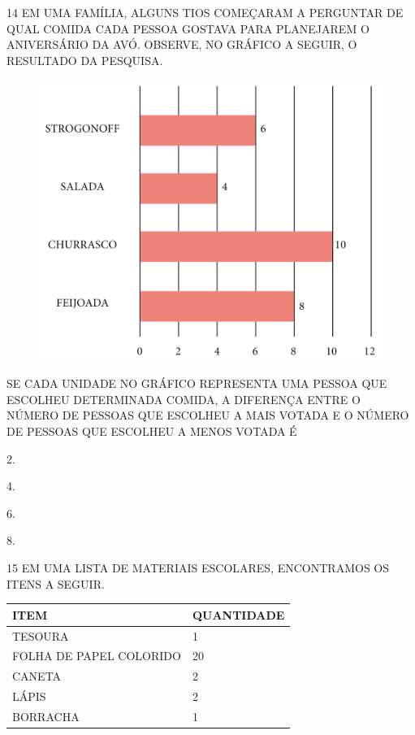 \num{14} EM UMA FAMÍLIA, ALGUNS TIOS COMEÇARAM A PERGUNTAR DE QUAL COMIDA CADA
PESSOA GOSTAVA PARA PLANEJAREM O ANIVERSÁRIO DA AVÓ. OBSERVE, NO GRÁFICO A SEGUIR,
O RESULTADO DA PESQUISA.

\begin{figure}[H]
\centering
\includegraphics[width=\textwidth]{./media/SAEB_1ANO_MAT_FIGURA141.png}
\end{figure}

SE CADA UNIDADE NO GRÁFICO REPRESENTA UMA PESSOA QUE ESCOLHEU DETERMINADA COMIDA,
A DIFERENÇA ENTRE O NÚMERO DE PESSOAS QUE ESCOLHEU A MAIS VOTADA E O NÚMERO DE
PESSOAS QUE ESCOLHEU A MENOS VOTADA É

\begin{escolha}[itemsep=-5pt]
\item 2.

\item 4.

\item 6.

\item 8.
\end{escolha}


\num{15} EM UMA LISTA DE MATERIAIS ESCOLARES, ENCONTRAMOS OS ITENS A SEGUIR.


\begin{table}[!ht]
    \centering
    \begin{tabular}{|l|l|}
    \hline
        \textbf{ITEM} & \textbf{QUANTIDADE} \\ \hline
        TESOURA & 1 \\ \hline
        FOLHA DE PAPEL COLORIDO & 20 \\ \hline
        CANETA & 2 \\ \hline
        LÁPIS & 2 \\ \hline
        BORRACHA & 1 \\ \hline
    \end{tabular}
\end{table}

